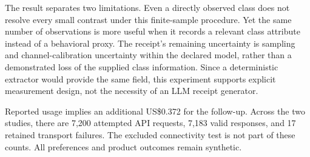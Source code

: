 The result separates two limitations. Even a directly observed class does not resolve every small contrast under this finite-sample procedure. Yet the same number of observations is more useful when it records a relevant class attribute instead of a behavioral proxy. The receipt's remaining uncertainty is sampling and channel-calibration uncertainty within the declared model, rather than a demonstrated loss of the supplied class information. Since a deterministic extractor would provide the same field, this experiment supports explicit measurement design, not the necessity of an LLM receipt generator.

Reported usage implies an additional US\$0.372 for the follow-up. Across the two studies, there are 7,200 attempted API requests, 7,183 valid responses, and 17 retained transport failures. The excluded connectivity test is not part of these counts. All preferences and product outcomes remain synthetic.
